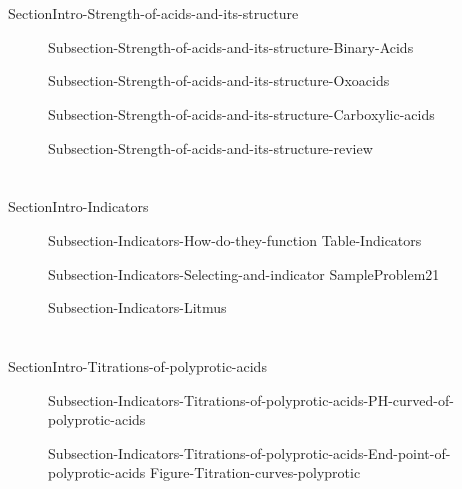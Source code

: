 \documentclass[main.tex]{subfiles}
\begin{document}
 \section{\color{blue!30!black}{Molecular mechanisms behind acid-base strength}}{SectionIntro-Strength-of-acids-and-its-structure}
\sloppy\begin{description}
\item[] {Subsection-Strength-of-acids-and-its-structure-Binary-Acids}
\item[] {Subsection-Strength-of-acids-and-its-structure-Oxoacids}
\item[] {Subsection-Strength-of-acids-and-its-structure-Carboxylic-acids}
\item[] {Subsection-Strength-of-acids-and-its-structure-review}
 \end{description}

  \section{\color{blue!30!black}{Indicators}}{SectionIntro-Indicators}
\sloppy\begin{description}
\item[] {Subsection-Indicators-How-do-they-function}
   {Table-Indicators} 

\item[] {Subsection-Indicators-Selecting-and-indicator}
   {SampleProblem21}
   \item[] {Subsection-Indicators-Litmus}

 \end{description}
 
 
  \section{\color{blue!30!black}{Titrations of polyprotic acids}}{SectionIntro-Titrations-of-polyprotic-acids}
\sloppy\begin{description}
\item[] {Subsection-Indicators-Titrations-of-polyprotic-acids-PH-curved-of-polyprotic-acids}
\item[] {Subsection-Indicators-Titrations-of-polyprotic-acids-End-point-of-polyprotic-acids}
  {Figure-Titration-curves-polyprotic}

 \end{description}
 
\end{document}
